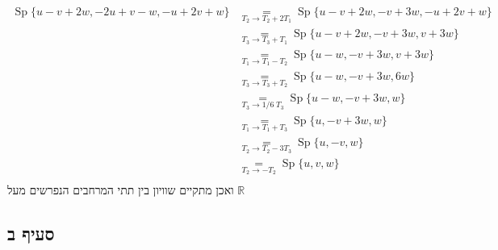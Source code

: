 \documentclass{article}
\newcommand\underrel[2]{\mathrel{\mathop{#2}\limits_{#1}}}
\DeclareMathOperator\Sp{Sp}
\begin{document}
\[
    \begin{matrix}
        \Sp\{ u - v + 2w, -2u + v - w, -u + 2v + w \} &
        \underrel{T_2\rightarrow T_2+2T_1}{=}
        \Sp\{ u - v + 2w, -v + 3w, -u + 2v + w \}       \\
                                                      &
        \underrel{T_3\rightarrow T_3+T_1}{=}
        \Sp\{ u - v + 2w, -v + 3w, v + 3w \}            \\
                                                      &
        \underrel{T_1\rightarrow T_1-T_2}{=}
        \Sp\{ u - w, -v + 3w, v + 3w \}                 \\
                                                      &
        \underrel{T_3\rightarrow T_3+T_2}{=}
        \Sp\{ u - w, -v + 3w, 6w \}                     \\
                                                      &
        \underrel{T_3\rightarrow 1/6\;T_3}{=}
        \Sp\{ u - w, -v + 3w, w \}                      \\
                                                      &
        \underrel{T_1\rightarrow T_1+T_3}{=}
        \Sp\{ u, -v + 3w, w \}                          \\
                                                      &
        \underrel{T_2\rightarrow T_2-3T_3}{=}
        \Sp\{ u, -v, w \}                               \\
                                                      &
        \underrel{T_2\rightarrow -T_2}{=}
        \Sp\{ u, v, w \}                                \\
    \end{matrix}
\]
ואכן מתקיים שוויון בין תתי המרחבים הנפרשים מעל $\mathbb{R}$

\subsection*{סעיף ב}
\end{document}
